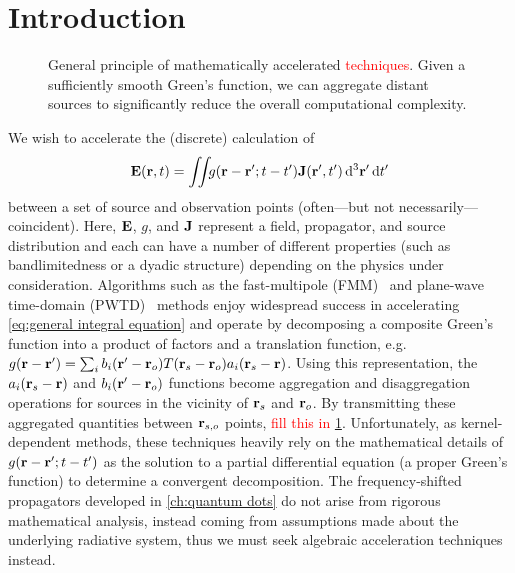 \section{Introduction}

\begin{figure}[]
  \centering
  
  \caption{General principle of mathematically accelerated \textcolor{red}{techniques}.
    Given a sufficiently smooth Green's function, we can aggregate distant sources to significantly reduce the overall computational complexity.
  }
  \label{fig:box to box}
\end{figure}

We wish to accelerate the (discrete) calculation of 
\begin{equation}
  \vb{E}(\vb{r}, t) = \iint_{} g(\vb{r} - \vb{r}'; t - t') \vb{J}(\vb{r}', t') \dd[3]{\vb{r}'} \dd{t'}
  \label{eq:general integral equation}
\end{equation}
between a set of source and observation points (often---but not necessarily---coincident).
Here, $\vb{E}$, $g$, and $\vb{J}$ represent a field, propagator, and source distribution and each can have a number of different properties (such as bandlimitedness or a dyadic structure) depending on the physics under consideration.
Algorithms such as the fast-multipole (FMM)~\cite{Greengard1987} and plane-wave time-domain (PWTD)~\cite{Ergin1999} methods enjoy widespread success in accelerating \cref{eq:general integral equation} and operate by decomposing a composite Green's function into a product of factors and a translation function, e.g.\ $g(\vb{r} - \vb{r}') = \sum_i b_i(\vb{r}' - \vb{r}_o) T(\vb{r}_s - \vb{r}_o) a_i(\vb{r}_s - \vb{r})$.
Using this representation, the $a_i(\vb{r}_s - \vb{r})$ and $b_i(\vb{r}' - \vb{r}_o)$ functions become aggregation and disaggregation operations for sources in the vicinity of $\vb{r}_s$ and $\vb{r}_o$.
By transmitting these aggregated quantities between $\vb{r}_{s,o}$ points, \textcolor{red}{fill this in} \cref{fig:box to box}.
Unfortunately, as kernel-dependent methods, these techniques heavily rely on the mathematical details of $g(\vb{r} - \vb{r}'; t - t')$ as the solution to a partial differential equation (a proper Green's function) to determine a convergent decomposition.
The frequency-shifted propagators developed in \cref{ch:quantum dots} do not arise from rigorous mathematical analysis, instead coming from assumptions made about the underlying radiative system, thus we must seek algebraic acceleration techniques instead.

